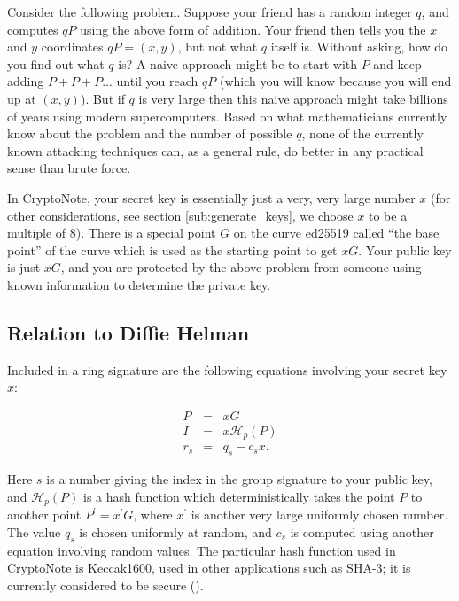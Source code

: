 \documentclass[12pt,english]{mrl}
\numberwithin{equation}{section}
\numberwithin{figure}{section}
\begin{document}
Consider the following problem. Suppose your friend has a random integer
$q$, and computes $qP$ using the above form of addition. Your friend
then tells you the $x$ and $y$ coordinates $qP=\left(x,y\right)$,
but not what $q$ itself is. Without asking, how do you find out what
$q$ is? $ $A naive approach might be to start with $P$ and keep
adding $P+P+P...$ until you reach $qP$ (which you will know because
you will end up at $\left(x,y\right)$). But if $q$ is very large
then this naive approach might take billions of years using modern
supercomputers. Based on what mathematicians currently know about
the problem and the number of possible $q$, none of the currently
known attacking techniques can, as a general rule, do better in any
practical sense than brute force.

In CryptoNote, your secret key is essentially just a very, very large
number $x$ (for other considerations, see section \ref{sub:generate_keys},
we choose $x$ to be a multiple of $8$). There is a special point
$G$ on the curve ed25519 called ``the base point'' of the curve
which is used as the starting point to get $xG$. Your public key is just $xG$, and you are protected by the above problem from someone using known information to determine the private key.


\subsection{\label{sub:Relation-to-Diffie}Relation to Diffie Helman}

Included in a ring signature are the following equations
involving your secret key $x$:

\begin{eqnarray*}
P&=&xG \\
I&=&x\mathcal{H}_{p}\left(P\right) \\
r_{s}&=&q_{s}-c_{s}x.
\end{eqnarray*}

Here $s$ is a number giving the index in the group signature to
your public key, and $\mathcal{H}_{p}\left(P\right)$ is a hash function which
deterministically takes the point $P$ to another point $P^{\prime}=x^{\prime}G$,
where $x^{\prime}$ is another very large uniformly chosen number.
The value $q_s$ is chosen uniformly at random, and $c_s$ is computed using
another equation involving random values.
The particular hash function used in CryptoNote is Keccak1600,
used in other applications such as SHA-3; it is currently considered
to be secure (\cite{FIPS}). 
\end{document}
